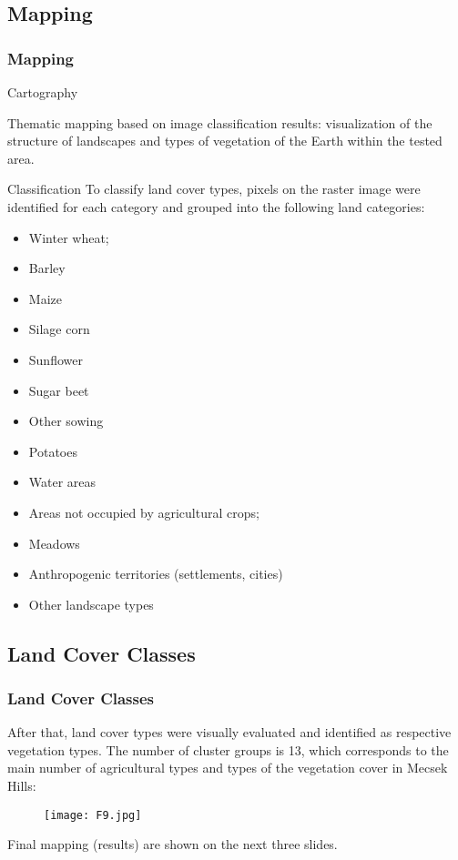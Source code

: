 \documentclass[pdflatex,compress,10pt,
	xcolor={dvipsnames,dvipsnames,svgnames,x11names,table},
	hyperref={
	breaklinks = true, 
	pdfauthor={Lemenkova Polina}, 
	pdfsubject={Preentation}, 
	pdfcreator={Lemenkova Polina}, 
	pdfproducer={Lemenkova Polina}, 
	citecolor=NavyBlue, 
	urlcolor = NavyBlue, 
	breaklinks = true}]{beamer}
\begin{document}
\subsection{Mapping}
\begin{frame}\frametitle{Mapping}

\begin{alertblock}{Cartography}

Thematic mapping based on image classification results: visualization of the structure of landscapes and types of vegetation of the Earth within the tested area.
\end{alertblock}

\begin{block}{Classification}
To classify land cover types, pixels on the raster image were identified for each category and grouped into the following land categories: 
\begin{multicols}{2}
\begin{itemize}
	\item Winter wheat;
	\item Barley
	\item Maize
	\item Silage corn
	\item Sunflower
	\item Sugar beet
	\item Other sowing
	\item Potatoes
	\item Water areas
	\item Areas not occupied by agricultural crops;
	\item Meadows
	\item Anthropogenic territories (settlements, cities)
	\item Other landscape types
\end{itemize}
\end{multicols}
\end{block}

\end{frame}

\subsection{Land Cover Classes}
\begin{frame}\frametitle{Land Cover Classes}
After that, land cover types were visually evaluated and identified as respective vegetation types. The number of cluster groups is 13, which corresponds to the main number of agricultural types and types of the vegetation cover in Mecsek Hills:
\begin{figure}[H]
	\centering
		\texttt{[image: F9.jpg]}
\end{figure}
Final mapping (results) are shown on the next three slides.
\end{frame}
\end{document}
